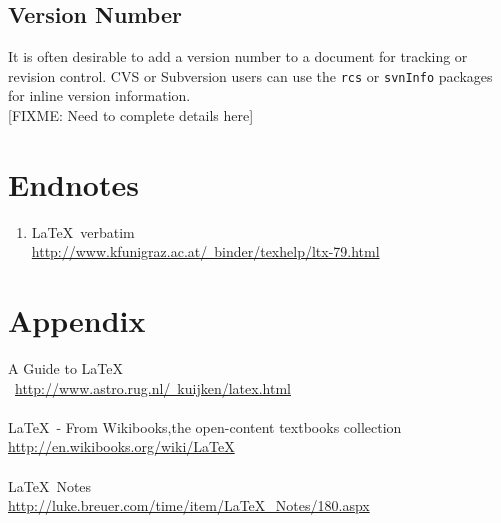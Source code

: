 \documentclass[12pt,letterpaper,dvips]{article}
\newcommand{\FIXME}[1]{\textsf{[FIXME: #1]}}
\newcommand{\cmd}[1]{\texttt{#1}}
\begin{document}
\clearpage
\newpage
\subsection{Version Number}
It is often desirable to add a version number to a document for
tracking or revision control.  CVS or Subversion users can 
use the \cmd{rcs} or \cmd{svnInfo} packages for inline version
information.\\


\noindent\FIXME{Need to complete details here}



\clearpage
\newpage
\setcounter{secnumdepth}{0}
\section{Endnotes}

\begin{enumerate}

\item \LaTeX\ verbatim\\
\href{http://www.kfunigraz.ac.at/~binder/texhelp/ltx-79.html}
{http://www.kfunigraz.ac.at/~binder/texhelp/ltx-79.html}

\end{enumerate}


\setcounter{secnumdepth}{0}
\section{Appendix}


A Guide to \LaTeX\\\
\href{http://www.astro.rug.nl/~kuijken/latex.html}
{http://www.astro.rug.nl/~kuijken/latex.html}
\\
\\
\LaTeX\ - From Wikibooks,the open-content textbooks collection\\
\href{http://en.wikibooks.org/wiki/LaTeX}{http://en.wikibooks.org/wiki/LaTeX}
\\
\\
\LaTeX\ Notes\\
\href{http://luke.breuer.com/time/item/LaTeX\_Notes/180.aspx}{http://luke.breuer.com/time/item/LaTeX\_Notes/180.aspx}
\end{document}
